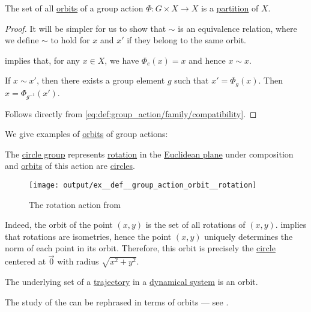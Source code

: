 \begin{proposition}\label{thm:orbit_induces_partition}
  The set of all \hyperref[def:group_action_orbit]{orbits} of a group action \( \Phi: G \times X \to X \) is a \hyperref[def:set_partition]{partition} of \( X \).
\end{proposition}
\begin{proof}
  It will be simpler for us to show that \( {\sim} \) is an equivalence relation, where we define \( {\sim} \) to hold for \( x \) and \( x' \) if they belong to the same orbit.

    implies that, for any \( x \in X \), we have \( \Phi_e(x) = x \) and hence \( x \sim x \).

   If \( x \sim x' \), then there exists a group element \( g \) such that \( x' = \Phi_g(x) \). Then \( x = \Phi_{g^{-1}}(x') \).

   Follows directly from \eqref{eq:def:group_action/family/compatibility}.
\end{proof}

\begin{example}\label{ex:def:group_action_orbit}
  We give examples of \hyperref[def:group_action_orbit]{orbits} of group actions:
  \begin{thmenum}
     The \hyperref[def:circle_group]{circle group} represents \hyperref[def:rigid_motion/rotation]{rotation} in the \hyperref[def:euclidean_plane]{Euclidean plane} under composition and \hyperref[def:group_action_orbit]{orbits} of this action are \hyperref[def:circle]{circles}.

    \begin{figure}
      \centering
      \texttt{[image: output/ex\_\_def\_\_group\_action\_orbit\_\_rotation]}
      \caption{The rotation action from }
      \label{fig:ex:def:group_action_orbit/rotation}
    \end{figure}

    Indeed, the orbit of the point \( (x, y) \) is the set of all rotations of \( (x, y) \).  implies that rotations are isometries, hence the point \( (x, y) \) uniquely determines the norm of each point in its orbit. Therefore, this orbit is precisely the \hyperref[def:circle]{circle} centered at \( \vec 0 \) with radius \( \sqrt{x^2 + y^2} \).

     The underlying set of a \hyperref[def:dynamical_system_trajectory]{trajectory} in a \hyperref[def:dynamical_system]{dynamical system} is an orbit.

     The study of the  can be rephrased in terms of orbits --- see .
  \end{thmenum}
\end{example}

